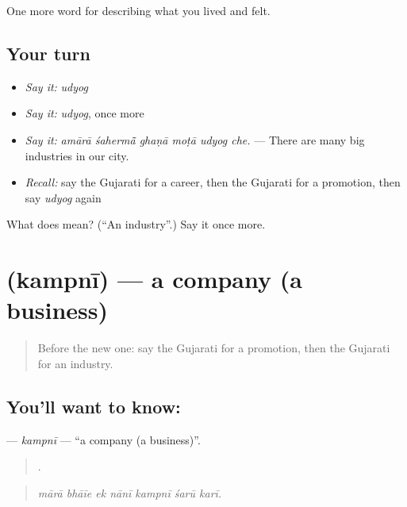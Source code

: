 \begin{grammarlens}[title={What you've built}]
One more word for describing what you lived and felt.
\end{grammarlens}

\subsection*{Your turn}
\begin{itemize}
\raggedright
  \item \emph{Say it:} \emph{udyog}
  \item \emph{Say it:} \emph{udyog}, once more
  \item \emph{Say it:} \emph{amārā śahermā̃ ghaṇā moṭā udyog che.} — There are many big industries in our city.
  \item \emph{Recall:} say the Gujarati for a career, then the Gujarati for a promotion, then say \emph{udyog} again
\end{itemize}

\begin{tcolorbox}[breakable,colback=teal!4,colframe=teal!35!black,title={Before you move on}]
What does  mean? (\textquotedblleft{}An industry\textquotedblright{}.) Say it once more.
\end{tcolorbox}
\section[\texorpdfstring{\gu{કંપની} (kampnī)}{કંપની (kampnī)}]{ (kampnī) — a company (a business)}

\label{lesson:GU-C513-kampni}



\begin{quote}
Before the new one: say the Gujarati for a promotion, then the Gujarati for an industry.
\end{quote}

\subsection*{You'll want to know: }
\textbf{} — \emph{kampnī} — \textquotedblleft{}a company (a business)\textquotedblright{}.

\begin{quote}
      .
\end{quote}

\begin{quote}
\emph{mārā bhāīe ek nānī kampnī śarū karī.}
\end{quote}

